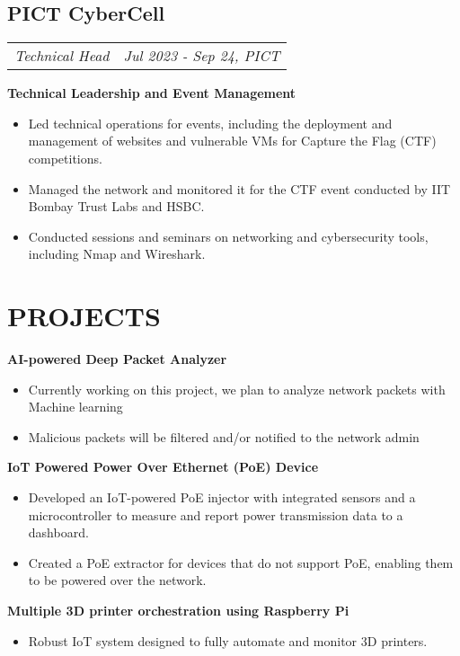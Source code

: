 \documentclass[10pt,a4paper,hidelinks,unicode]{moderncv}
\newcommand*{\experienceentry}[5][1.5mm]{
    \subsection{#2} \vspace{-1.5mm}
    \begin{tabularx}{\textwidth}{LR}
        {\itshape #3} & {\itshape #4, #5}
    \end{tabularx}
    \par\addvspace{#1}
}
\begin{document}
\begin{minipage}[t]{0.62\textwidth}
\experienceentry{PICT CyberCell}{Technical Head}{Jul 2023 - Sep 24}{PICT}

\textbf{Technical Leadership and Event Management}
\begin{itemize}
    \item Led technical operations for events, including the deployment and management of websites and vulnerable VMs for Capture the Flag (CTF) competitions.
    \item Managed the network and monitored it for the CTF event conducted by IIT Bombay Trust Labs and HSBC.
    \item Conducted sessions and seminars on networking and cybersecurity tools, including Nmap and Wireshark.
\end{itemize}
\vspace{2.0mm}

\section{PROJECTS}

\textbf{AI-powered Deep Packet Analyzer}
\begin{itemize}
    \item Currently working on this project, we plan to analyze network packets with Machine learning 
    \item Malicious packets will be filtered and/or notified to the network admin
\end{itemize}
\vspace{2.0mm}

\textbf{IoT Powered Power Over Ethernet (PoE) Device}
\begin{itemize}
    \item Developed an IoT-powered PoE injector with integrated sensors and a microcontroller to measure and report power transmission data to a dashboard.
    \item Created a PoE extractor for devices that do not support PoE, enabling them to be powered over the network.
\end{itemize}
\vspace{2.0mm}

\textbf{Multiple 3D printer orchestration using Raspberry Pi}
\begin{itemize}
    \item Robust IoT system designed to fully automate and monitor 3D printers.
\end{itemize}
\vspace{2.0mm}



\end{minipage}
\end{document}
